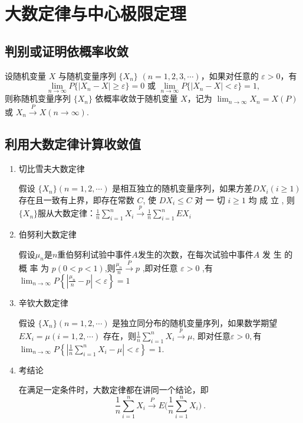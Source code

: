 \chapter{大数定律与中心极限定理}

\section{判别或证明依概率收敛}
设随机变量 $X$ 与随机变量序列 $\{X_n\}$ $(n=1,2,3,\cdots)$，如果对任意的 $\varepsilon > 0$，有
$$\lim_{n\to\infty}P\{|X_n-X|\geqslant\varepsilon\}=0 \text{ 或 } \lim_{n\to\infty}P\{|X_n-X|<\varepsilon\}=1,$$
则称随机变量序列 $\{X_n\}$ 依概率收敛于随机变量 $X$，记为 $\lim_{n\to\infty}X_n=X(P)$ 或 $X_n\xrightarrow{P}X(n\to\infty)$.

\section{利用大数定律计算收敛值}
\begin{enumerate}
    \item 切比雪夫大数定律

          假设 $\{X_{n}\}(n=1,2,\cdots)$ 是相互独立的随机变量序列，如果方差$DX_i(i\geqslant1)$存在且一致有上界，即存在常数 $C$, 使 $DX_i\leq C$ 对 一 切  $i\geqslant 1$ 均 成 立 , 则  $\{ X_n\}$服从大数定律：$\frac1n\sum_{i=1}^{n}X_i\xrightarrow{p}\frac1n\sum_{i=1}^{n}EX_i$
    \item 伯努利大数定律

          假设$\mu_n$是$n$重伯努利试验中事件$A$发生的次数，在每次试验中事件$A$ 发 生 的 概 率 为 $p( 0< p< 1)$,则$\frac{\mu_n}n\xrightarrow{P}p$ ,即对任意 $\varepsilon>0$ ,有$\lim_{n\to\infty} P\left\{\left|\frac{\mu_n}{n}-p\right|<\varepsilon\right\}=1$
    \item 辛钦大数定律

          假设 $\{X_{n}\} (n=1,2,\cdots)$ 是独立同分布的随机变量序列，如果数学期望 $EX_{i}=\mu (i=1,2,\cdots)$ 存在，则$\frac{1}{n}\sum_{i=1}^{n}X_{i} \xrightarrow{p} \mu $, 即对任意$ \varepsilon > 0, $有$ \lim_{n \to \infty} P\left\{\left|\frac{1}{n}\sum_{i=1}^{n}X_{i} - \mu\right| < \varepsilon\right\} = 1 $.
    \item 考结论

          在满足一定条件时，大数定律都在讲同一个结论，即
          $$\frac{1}{n}\sum_{i=1}^{n}X_{i}\xrightarrow{P}E\biggl(\frac{1}{n}\sum_{i=1}^{n}X_{i}\biggr)\:.$$
\end{enumerate}


